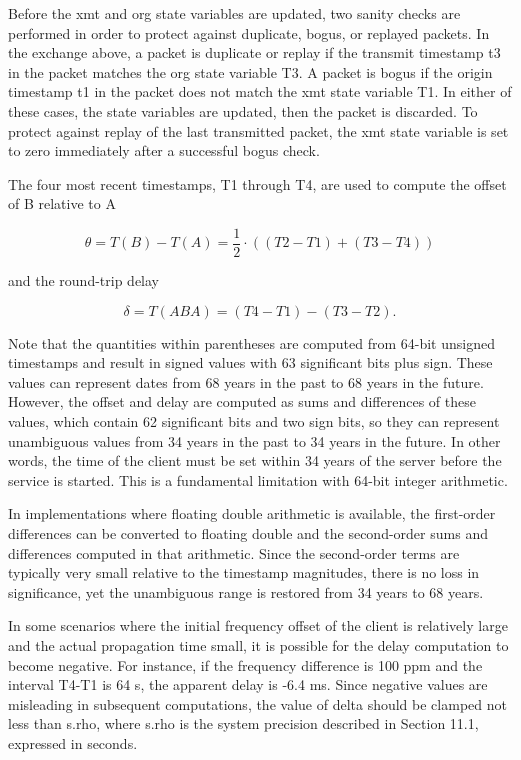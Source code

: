 Before the xmt and org state variables are updated, two sanity checks
are performed in order to protect against duplicate, bogus, or
replayed packets. In the exchange above, a packet is duplicate or
replay if the transmit timestamp t3 in the packet matches the org
state variable T3. A packet is bogus if the origin timestamp t1 in
the packet does not match the xmt state variable T1. In either of
these cases, the state variables are updated, then the packet is
discarded. To protect against replay of the last transmitted packet,
the xmt state variable is set to zero immediately after a successful
bogus check.

The four most recent timestamps, T1 through T4, are used to compute
the offset of B relative to A

$$
\theta = T(B) - T(A) = \frac{1}{2} \cdot ((T2 - T1) + (T3 - T4))
$$

and the round-trip delay

$$
\delta = T(ABA) = (T4 - T1) - (T3 - T2).
$$

Note that the quantities within parentheses are computed from 64-bit
unsigned timestamps and result in signed values with 63 significant
bits plus sign. These values can represent dates from 68 years in
the past to 68 years in the future. However, the offset and delay
are computed as sums and differences of these values, which contain
62 significant bits and two sign bits, so they can represent
unambiguous values from 34 years in the past to 34 years in the
future. In other words, the time of the client must be set within 34
years of the server before the service is started. This is a
fundamental limitation with 64-bit integer arithmetic.

In implementations where floating double arithmetic is available, the
first-order differences can be converted to floating double and the
second-order sums and differences computed in that arithmetic. Since
the second-order terms are typically very small relative to the
timestamp magnitudes, there is no loss in significance, yet the
unambiguous range is restored from 34 years to 68 years.

In some scenarios where the initial frequency offset of the client is
relatively large and the actual propagation time small, it is
possible for the delay computation to become negative. For instance,
if the frequency difference is 100 ppm and the interval T4-T1 is 64
s, the apparent delay is -6.4 ms. Since negative values are
misleading in subsequent computations, the value of delta should be
clamped not less than s.rho, where s.rho is the system precision
described in Section 11.1, expressed in seconds.

